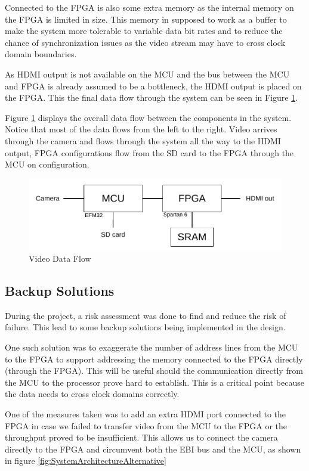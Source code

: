 Connected to the FPGA is also some extra memory as the internal memory on the FPGA is limited in size.
This memory in supposed to work as a buffer to make the system more tolerable to variable data bit rates and to reduce the chance of synchronization issues as the video stream may have to cross clock domain boundaries.

As HDMI output is not available on the MCU and the bus between the MCU and FPGA is already assumed to be a bottleneck, the HDMI output is placed on the FPGA.
This the final data flow through the system can be seen in Figure \ref{fig:SystemArchitecture}.

Figure \ref{fig:SystemArchitecture} displays the overall data flow between the components in the system.
Notice that most of the data flows from the left to the right. Video arrives through the camera and flows through the system all the way to the HDMI output, FPGA configurations flow from the SD card to the FPGA through the MCU on configuration.

\begin{figure}
    \includegraphics{img/SystemArchitecture}
    \caption{Video Data Flow}
    \label{fig:SystemArchitecture}
\end{figure}

\subsection{Backup Solutions} \label{subsec:RiskAssessment}
During the project, a risk assessment was done to find and reduce the risk of failure.
This lead to some backup solutions being implemented in the design.

One such solution was to exaggerate the number of address lines from the MCU to the FPGA to support addressing the memory connected to the FPGA directly (through the FPGA).
This will be useful should the communication directly from the MCU to the processor prove hard to establish.
This is a critical point because the data needs to cross clock domains correctly.

One of the measures taken was to add an extra HDMI port connected to the FPGA in case we failed to transfer video from the MCU to the FPGA or the throughput proved to be insufficient.
This allows us to connect the camera directly to the FPGA and circumvent both the EBI bus and the MCU, as shown in figure \ref{fig:SystemArchitectureAlternative}

